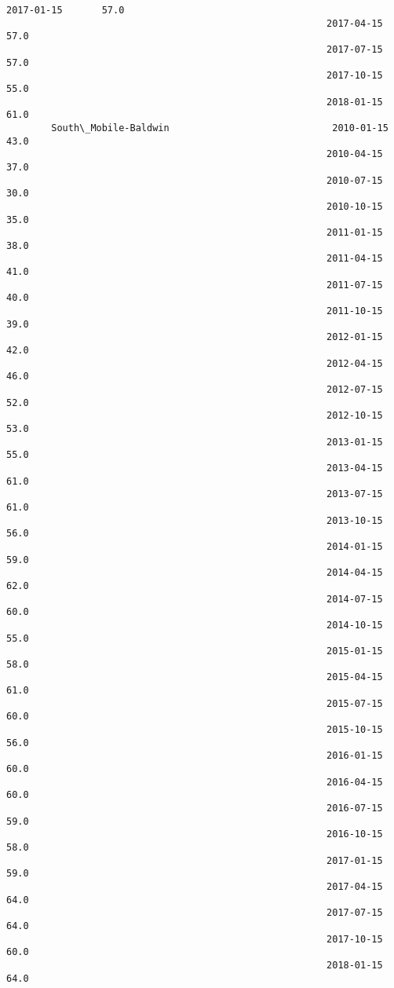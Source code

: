 \documentclass[11pt]{article}
\begin{document}
\begin{Verbatim}[commandchars=\\\{\}]
                                                         2017-01-15       57.0   
                                                         2017-04-15       57.0   
                                                         2017-07-15       57.0   
                                                         2017-10-15       55.0   
                                                         2018-01-15       61.0   
        South\_Mobile-Baldwin                             2010-01-15       43.0   
                                                         2010-04-15       37.0   
                                                         2010-07-15       30.0   
                                                         2010-10-15       35.0   
                                                         2011-01-15       38.0   
                                                         2011-04-15       41.0   
                                                         2011-07-15       40.0   
                                                         2011-10-15       39.0   
                                                         2012-01-15       42.0   
                                                         2012-04-15       46.0   
                                                         2012-07-15       52.0   
                                                         2012-10-15       53.0   
                                                         2013-01-15       55.0   
                                                         2013-04-15       61.0   
                                                         2013-07-15       61.0   
                                                         2013-10-15       56.0   
                                                         2014-01-15       59.0   
                                                         2014-04-15       62.0   
                                                         2014-07-15       60.0   
                                                         2014-10-15       55.0   
                                                         2015-01-15       58.0   
                                                         2015-04-15       61.0   
                                                         2015-07-15       60.0   
                                                         2015-10-15       56.0   
                                                         2016-01-15       60.0   
                                                         2016-04-15       60.0   
                                                         2016-07-15       59.0   
                                                         2016-10-15       58.0   
                                                         2017-01-15       59.0   
                                                         2017-04-15       64.0   
                                                         2017-07-15       64.0   
                                                         2017-10-15       60.0   
                                                         2018-01-15       64.0   
        

\end{Verbatim}
\end{document}
